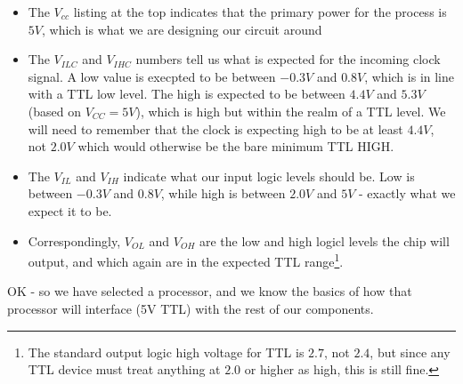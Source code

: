 \begin{itemize}
\item The $V_{cc}$ listing at the top indicates that the primary power for the process is $5V$, which is what we are designing our circuit around
\item The $V_{ILC}$ and $V_{IHC}$ numbers tell us what is expected for the incoming clock signal. A low value is execpted to be between $-0.3V$ and $0.8V$, which is in line with a TTL low level. The high is expected to be between $4.4V$ and $5.3V$ (based on $V_{CC} = 5V$), which is high but within the realm of a TTL level. We will need to remember that the clock is expecting high to be at least $4.4V$, not $2.0V$ which would otherwise be the bare minimum TTL HIGH.
\item The $V_{IL}$ and $V_{IH}$ indicate what our input logic levels should be. Low is between $-0.3V$ and $0.8V$, while high is between $2.0V$ and $5V$ - exactly what we expect it to be. 
\item Correspondingly, $V_{OL}$ and $V_{OH}$ are the low and high logicl levels the chip will output, and which again are in the expected TTL range\footnote{The standard output logic high voltage for TTL is $2.7$, not $2.4$, but since any TTL device must treat anything at $2.0$ or higher as high, this is still fine.}.
\end{itemize}

OK - so we have selected a processor, and we know the basics of how that processor will interface (5V TTL) with the rest of our components. 



